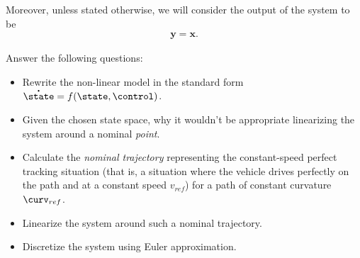 			
		Moreover, unless stated otherwise, we will consider the output of the system to be 
		\begin{align}
			\mathbf{y} = \mathbf{x}.
		\end{align}

		Answer the following questions:
		\begin{itemize}
			\item Rewrite the non-linear model in the standard form $\mathbf{\dot{\state}} = f(\mathbf{\state},\mathbf{\control})$.
			\item Given the chosen state space, why it wouldn't be appropriate linearizing the system around a nominal \emph{point}.
			\item Calculate the \emph{nominal trajectory} representing the constant-speed perfect tracking situation (that is, a situation where the vehicle drives perfectly on the path and at a constant speed %
			$v_{ref}$) for a path of constant curvature $\curv_{ref}$. 
			\item Linearize the system around such a nominal trajectory.
			\item Discretize the system using Euler approximation. 
		\end{itemize}


